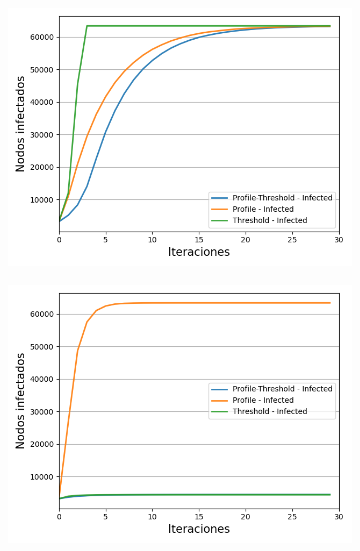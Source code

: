 \documentclass{article}
\begin{document}
\begin{figure}[!tbp]
\begin{subfigure}[b]{0.5\textwidth}
		\caption{}
		\label{fig:f2}
	\end{subfigure}
		\begin{subfigure}[b]{0.5\textwidth}
		\includegraphics[width=\textwidth, height=\textwidth]{../Images/Fig 1 c).png}
		\caption{}
		\label{fig:f3}
	\end{subfigure}
	\hfill
	\begin{subfigure}[b]{0.5\textwidth}
		\includegraphics[width=\textwidth, height=\textwidth]{../Images/Fig 1 d).png}

\end{subfigure}
\end{figure}
\end{document}
